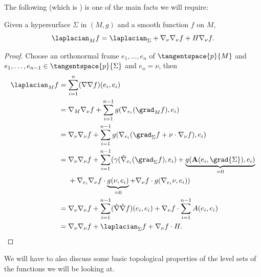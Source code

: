 \documentclass[titlepage,numbers=noenddot,headinclude,oneside,%
footinclude=true,cleardoublepage=empty,%
BCOR=5mm,paper=a4,fontsize=11pt,%
english,%
]{scrartcl}
\begin{document}
{The following (which is \cite[Exercise 2.3 in][]{leeGeometricRelativity2019}) is one of the main facts we will require:
\begin{fact}\label{fact:laplacian_and_hypersurface_laplacian}
    Given a hypersurface \( \Sigma \) in \( (M,g) \) and a smooth function \( f \) on \( M \),
    \begin{equation*}
        \laplacian_M f=\laplacian_\Sigma +\Mconnection_\nu\Mconnection_\nu f+H \Mconnection_\nu f.
    \end{equation*}
\end{fact}
\begin{proof}
    Choose an orthonormal frame \( e_1,\dotsc,e_n \) of \( \tangentspace{p}{M} \) and \( e_1,\dotsc,e_{n-1}\in \tangentspace{p}{\Sigma} \) and \( e_n=\nu \), then
    \begin{align*}
        \laplacian_M f&=\sum_{i=1}^{n}(\Mconnection\Mconnection f)(e_i,e_i)\\
        &=\Mconnection_M \Mconnection_\nu f+\sum_{i=1}^{n-1}g(\Mconnection_{e_i} (\grad_M f),e_i)\\
        &=\Mconnection_\nu \Mconnection_\nu f+\sum_{i=1}^{n-1}g(\Mconnection_{e_i}(\grad_{\Sigma}f+\nu\cdot \Mconnection_\nu f),e_i)\\
        &=\begin{aligned}[t]
            &\Mconnection_\nu \Mconnection_\nu f+\sum_{i=1}^{n-1}(\gamma(\Sigmaconnection_{e_i}(\grad_{\Sigma} f),e_i)+\underbrace{g(\mathbf{A}(e_i,\grad{\Sigma}),e_i)}_{=0}\\
            &+\Mconnection_{
        e_i}\Mconnection_{\nu}f\cdot \underbrace{g(\nu,e_i)}_{=0}+\Mconnection_{\nu}f\cdot g(\Mconnection_{e_i}\nu,e_i))
        \end{aligned}\\
        &=\Mconnection_\nu \Mconnection_\nu f+\sum_{i=1}^{n-1}(\Sigmaconnection\Sigmaconnection f)(e_i,e_i)+\Mconnection_\nu f\cdot \sum_{i=1}^{n-1}A(e_i,e_i)\\
        &=\Mconnection_\nu \Mconnection_\nu f+\laplacian_{\Sigma}f+\Mconnection_{\nu}f\cdot H.
    \end{align*}
\end{proof}
}
We will have to also discuss some basic topological properties of the level sets of the functions we will be looking at.
\end{document}
